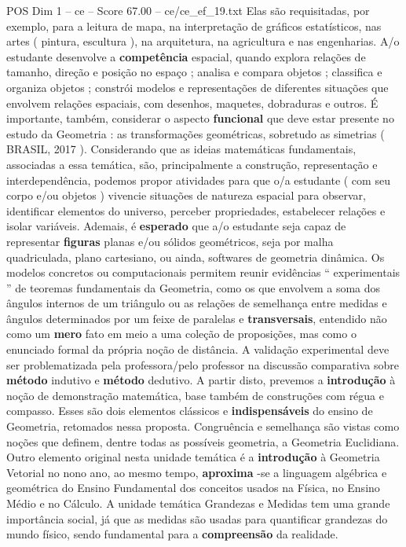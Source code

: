 \begin{textsample}{POS Dim 1 – ce – Score 67.00 – ce/ce\_ef\_19.txt}
Elas são requisitadas, por exemplo, para a leitura de mapa, na interpretação de gráficos estatísticos, nas artes ( pintura, escultura ), na arquitetura, na agricultura e nas engenharias.
A/o estudante desenvolve a \textbf{competência} espacial, quando explora relações de tamanho, direção e posição no espaço ; analisa e compara objetos ; classifica e organiza objetos ; constrói modelos e representações de diferentes situações que envolvem relações espaciais, com desenhos, maquetes, dobraduras e outros.
É importante, também, considerar o aspecto \textbf{funcional} que deve estar presente no estudo da Geometria : as transformações geométricas, sobretudo as simetrias ( BRASIL, 2017 ).
Considerando que as ideias matemáticas fundamentais, associadas a essa temática, são, principalmente a construção, representação e interdependência, podemos propor atividades para que o/a estudante ( com seu corpo e/ou objetos ) vivencie situações de natureza espacial para observar, identificar elementos do universo, perceber propriedades, estabelecer relações e isolar variáveis.
Ademais, é \textbf{esperado} que a/o estudante seja capaz de representar \textbf{figuras} planas e/ou sólidos geométricos, seja por malha quadriculada, plano cartesiano, ou ainda, softwares de geometria dinâmica.
Os modelos concretos ou computacionais permitem reunir evidências “ experimentais ” de teoremas fundamentais da Geometria, como os que envolvem a soma dos ângulos internos de um triângulo ou as relações de semelhança entre medidas e ângulos determinados por um feixe de paralelas e \textbf{transversais}, entendido não como um \textbf{mero} fato em meio a uma coleção de proposições, mas como o enunciado formal da própria noção de distância.
A validação experimental deve ser problematizada pela professora/pelo professor na discussão comparativa sobre \textbf{método} indutivo e \textbf{método} dedutivo.
A partir disto, prevemos a \textbf{introdução} à noção de demonstração matemática, base também de construções com régua e compasso.
Esses são dois elementos clássicos e \textbf{indispensáveis} do ensino de Geometria, retomados nessa proposta.
Congruência e semelhança são vistas como noções que definem, dentre todas as possíveis geometria, a Geometria Euclidiana.
Outro elemento original nesta unidade temática é a \textbf{introdução} à Geometria Vetorial no nono ano, ao mesmo tempo, \textbf{aproxima} -se a linguagem algébrica e geométrica do Ensino Fundamental dos conceitos usados na Física, no Ensino Médio e no Cálculo.
A unidade temática Grandezas e Medidas tem uma grande importância social, já que as medidas são usadas para quantificar grandezas do mundo físico, sendo fundamental para a \textbf{compreensão} da realidade.

\end{textsample}
